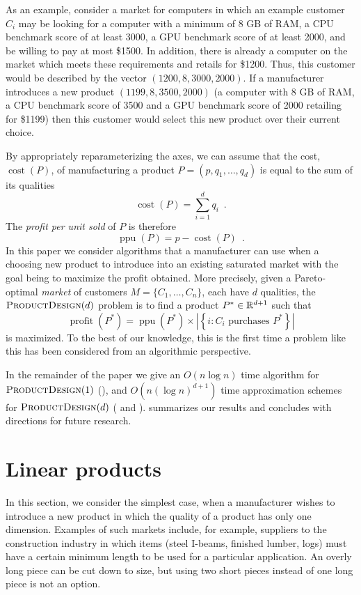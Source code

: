 \documentclass[lotsofwhite]{patmorin}
\newcommand{\cost}{\operatorname{cost}}
\newcommand{\ppu}{\operatorname{ppu}}
\newcommand{\val}{\operatorname{profit}}
\begin{document}
As an example, consider a market for computers in which an example customer
$C_i$ may be looking for a computer with a minimum of 8 GB of RAM, a CPU
benchmark score of at least 3000, a GPU benchmark score of at least 2000,
and be willing to pay at most \$1500.  In addition, there is already a
computer on the market which meets these requirements and retails for
\$1200.  Thus, this customer would be described by the vector
$(1200,8,3000,2000)$.  If a manufacturer introduces a new product
$(1199,8,3500,2000)$ (a computer with 8 GB of RAM, a CPU benchmark score of
3500 and a GPU benchmark score of 2000 retailing for \$1199) then this
customer would select this new product over their current choice.

By appropriately reparameterizing the axes, we can assume that the cost,
$\cost(P)$, of manufacturing a product $P=(p,q_1,\ldots,q_d)$ is equal to
the sum of its qualities
\[
   \cost(P) = \sum_{i=1}^d q_i \enspace .
\]
The \emph{profit per unit sold} of $P$ is therefore
\[
   \ppu(P) = p-\cost(P) \enspace .
\]
In this paper we consider algorithms that a manufacturer can use when
a choosing new product to introduce into an existing saturated market
with the goal being to maximize the profit obtained.  More precisely,
given a Pareto-optimal \emph{market} of customers $M=\{C_1,\ldots,C_n\}$,
each have $d$ qualities, the $\textsc{ProductDesign}(d)$ problem is to
find a product $P^*\in\mathbb{R}^{d+1}$ such that
\[
  \val(P^*) = \ppu(P^*)
    \times 
      \left| \left\{ i:\mbox{$C_i$ purchases $P^*$} \right\} \right|
\]
is maximized.  To the best of our knowledge, this is the first time a
problem like this has been considered from an algorithmic perspective.


In the remainder of the paper we give an $O(n\log n)$ time algorithm for
$\textsc{ProductDesign}(1)$ (), and $O(n(\log n)^{d+1})$ time
approximation schemes for $\textsc{ProductDesign}(d)$ (
and ).   summarizes our results and
concludes with directions for future research.


\section{Linear products}

In this section, we consider the simplest case, when a manufacturer
wishes to introduce a new product in which the quality of a product
has only one dimension.  Examples of such markets include, for example,
suppliers to the construction industry in which items (steel I-beams,
finished lumber, logs) must have a certain minimum length to be used for
a particular application.  An overly long piece can be cut down to size,
but using two short pieces instead of one long piece is not an option.
\end{document}
